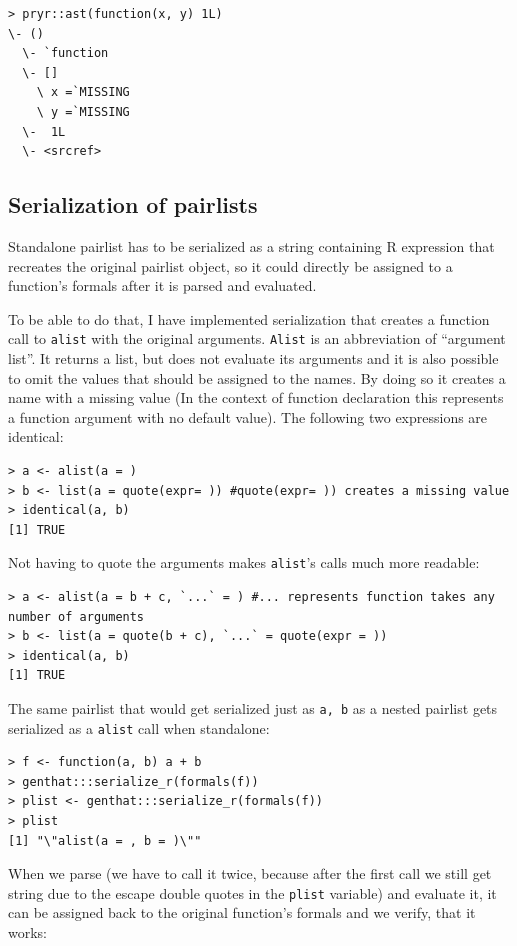 \documentclass[thesis=B,english]{FITthesis}[2012/10/20]
\begin{document}
\begin{verbatim}
> pryr::ast(function(x, y) 1L)
\- ()
  \- `function
  \- []
    \ x =`MISSING
    \ y =`MISSING
  \-  1L
  \- <srcref>
\end{verbatim}
\subsection{Serialization of pairlists}
Standalone pairlist has to be serialized as a string containing R expression that recreates the original pairlist object, so it could directly be assigned to a function’s formals after it is parsed and evaluated.

To be able to do that, I have implemented serialization that creates a function call to \verb|alist| with the original arguments. \verb|Alist| is an abbreviation of “argument list”. It returns a list, but does not evaluate its arguments and it is also possible to omit the values that should be assigned to the names. By doing so it creates a name with a missing value (In the context of function declaration this represents a function argument with no default value). The following two expressions are identical:

\begin{verbatim}
> a <- alist(a = )
> b <- list(a = quote(expr= )) #quote(expr= )) creates a missing value
> identical(a, b)
[1] TRUE
\end{verbatim}

Not having to quote the arguments makes \verb|alist|’s calls much more readable:

\begin{verbatim}
> a <- alist(a = b + c, `...` = ) #... represents function takes any number of arguments
> b <- list(a = quote(b + c), `...` = quote(expr = ))
> identical(a, b)
[1] TRUE
\end{verbatim}
The same pairlist that would get serialized just as \verb|a, b| as a nested pairlist gets serialized as a \verb|alist| call when standalone:
\begin{verbatim}
> f <- function(a, b) a + b
> genthat:::serialize_r(formals(f))
> plist <- genthat:::serialize_r(formals(f))
> plist
[1] "\"alist(a = , b = )\""
\end{verbatim}

When we parse (we have to call it twice, because after the first call we still get string due to the escape double quotes in the \verb|plist| variable) and evaluate it, it can be assigned back to the original function’s formals and we verify, that it works:
\end{document}
